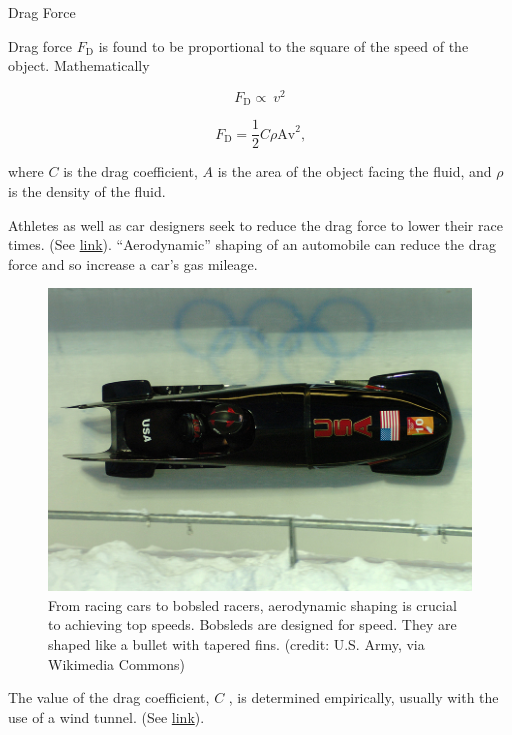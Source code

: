 \documentclass[
]{book}
\newenvironment{note}{}{}
\begin{document}
\hypertarget{fs-id1165298785006}{}
\begin{note}

Drag Force

Drag force \(F_{\text{D}}{}\) is found to be proportional to the square of
the speed of the object. Mathematically

\leavevmode\hypertarget{eip-4}{}%
\[{F_{\text{D}} \propto \ v^{2}}{}\]

\leavevmode\hypertarget{eip-833}{}%
\[{{F_{\text{D}} =}\frac{1}{2}{C\rho}\text{Av}^{2}}{}\text{,}\]

where \(C{}\) is the drag coefficient, \(A{}\) is the area of the object
facing the fluid, and \(\rho{}\) is the density of the fluid.

\end{note}

Athletes as well as car designers seek to reduce the drag force to lower
their race times. (See
\protect\hyperlink{import-auto-id1165298931800}{link}).
``Aerodynamic'' shaping of an automobile can reduce the drag force and so
increase a car's gas mileage.

\begin{figure}
\hypertarget{import-auto-id1165298931800}{%
\centering
\includegraphics{images/Figure_06_02_02a.jpg}
\caption{From racing cars to bobsled racers, aerodynamic shaping is crucial to
achieving top speeds. Bobsleds are designed for speed. They are shaped
like a bullet with tapered fins. (credit: U.S. Army, via Wikimedia
Commons)}\label{import-auto-id1165298931800}
}
\end{figure}

The value of the drag coefficient, \(C{}\) , is determined empirically,
usually with the use of a wind tunnel. (See
\protect\hyperlink{import-auto-id1165298787035}{link}).
\end{document}
